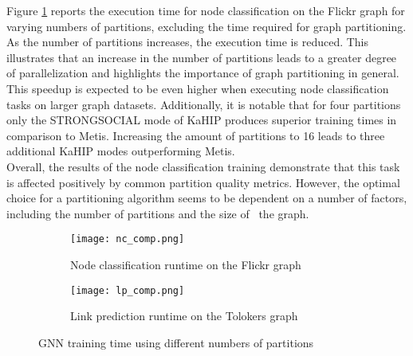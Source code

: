 \documentclass[acmsmall,nonacm,screen,review]{acmart}
\begin{document}
Figure \ref{nc_comp} reports the execution time for node classification on the Flickr graph for varying numbers of partitions, excluding the time required for graph partitioning. As the number of partitions increases, the execution time is reduced. This illustrates that an increase in the number of partitions leads to a greater degree of parallelization and highlights the importance of graph partitioning in general. This speedup is expected to be even higher when executing node classification tasks on larger graph datasets. Additionally, it is notable that for four partitions only the STRONGSOCIAL mode of KaHIP produces superior training times in comparison to Metis. Increasing the amount of partitions to 16 leads to three additional KaHIP modes outperforming Metis.\\
Overall, the results of the node classification training demonstrate that this task is affected positively by common partition quality metrics. However, the optimal choice for a partitioning algorithm seems to be dependent on a number of factors, including the number of partitions and the size of ~the graph.
\begin{figure}[bt!]
     \centering
     \begin{subfigure}[b]{0.45\textwidth}
         \centering
         \texttt{[image: nc\_comp.png]}
         \caption{Node classification runtime on the Flickr graph}
         \label{nc_comp}
     \end{subfigure}
     \hfill
     \begin{subfigure}[b]{0.45\textwidth}
         \centering
         \texttt{[image: lp\_comp.png]}
         \caption{Link prediction runtime on the Tolokers graph}
         \label{lp_comp}
     \end{subfigure}
     \caption{GNN training time using different numbers of partitions}
     \label{parts}
\end{figure}
\end{document}
